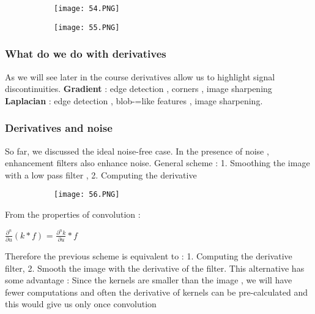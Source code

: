 \documentclass{article}
\begin{document}
 \begin{figure}[ht!]
  \centering
  \begin{subfigure}[b]{0.8\linewidth}
    \texttt{[image: 54.PNG]}
  \end{subfigure}
\end{figure}

 \begin{figure}[ht!]
  \centering
  \begin{subfigure}[b]{0.8\linewidth}
    \texttt{[image: 55.PNG]}
  \end{subfigure}
\end{figure}

\vspace{30mm}

\subsubsection{What do we do with derivatives}

As we will see later in the course derivatives allow us to highlight signal discontinuities.
\textbf{Gradient} : edge detection , corners , image sharpening
\textbf{Laplacian} : edge detection , blob-=like features , image sharpening.

\subsubsection{Derivatives and noise }

So far, we discussed the ideal noise-free case. In the presence of noise , enhancement filters also enhance noise.
General scheme : 1. Smoothing the image with a low pass filter , 2. Computing the derivative



\begin{figure}[ht!]
  \centering
  \begin{subfigure}[b]{0.25\linewidth}
    \texttt{[image: 56.PNG]}
  \end{subfigure}
\end{figure}


From the properties of convolution : 

$\frac{\partial^n }{\partial u}(k * f)$ = $\frac{\partial^n k}{\partial u}* f$

Therefore the previous scheme is equivalent to : 1. Computing the derivative filter, 2. Smooth the image with the derivative of the filter.
This alternative has some advantage : Since the kernels are smaller than the image , we will have fewer computations and often the derivative of kernels can be pre-calculated and this would give us only once convolution
\end{document}
